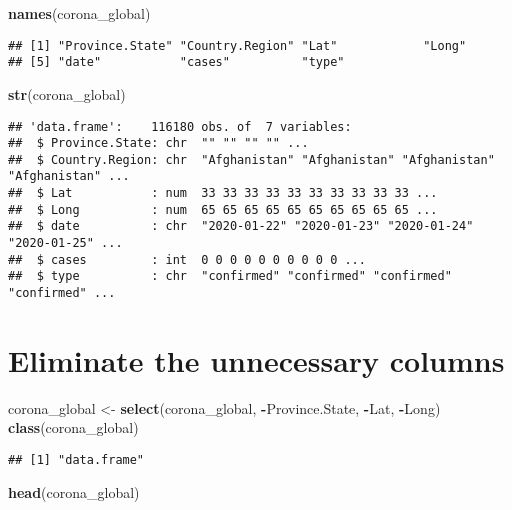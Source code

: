 \documentclass[
]{article}
\newenvironment{Shaded}{\begin{snugshade}}{\end{snugshade}}
\newcommand{\KeywordTok}[1]{\textcolor[rgb]{0.13,0.29,0.53}{\textbf{#1}}}
\newcommand{\NormalTok}[1]{#1}
\newcommand{\OperatorTok}[1]{\textcolor[rgb]{0.81,0.36,0.00}{\textbf{#1}}}
\newcommand{\StringTok}[1]{\textcolor[rgb]{0.31,0.60,0.02}{#1}}
\begin{document}
\begin{Shaded}
\begin{Highlighting}[]
\KeywordTok{names}\NormalTok{(corona_global)}
\end{Highlighting}
\end{Shaded}

\begin{verbatim}
## [1] "Province.State" "Country.Region" "Lat"            "Long"          
## [5] "date"           "cases"          "type"
\end{verbatim}

\begin{Shaded}
\begin{Highlighting}[]
\KeywordTok{str}\NormalTok{(corona_global)}
\end{Highlighting}
\end{Shaded}

\begin{verbatim}
## 'data.frame':    116180 obs. of  7 variables:
##  $ Province.State: chr  "" "" "" "" ...
##  $ Country.Region: chr  "Afghanistan" "Afghanistan" "Afghanistan" "Afghanistan" ...
##  $ Lat           : num  33 33 33 33 33 33 33 33 33 33 ...
##  $ Long          : num  65 65 65 65 65 65 65 65 65 65 ...
##  $ date          : chr  "2020-01-22" "2020-01-23" "2020-01-24" "2020-01-25" ...
##  $ cases         : int  0 0 0 0 0 0 0 0 0 0 ...
##  $ type          : chr  "confirmed" "confirmed" "confirmed" "confirmed" ...
\end{verbatim}

\hypertarget{eliminate-the-unnecessary-columns}{%
\section{Eliminate the unnecessary
columns}\label{eliminate-the-unnecessary-columns}}

\begin{Shaded}
\begin{Highlighting}[]
\NormalTok{corona_global <-}\StringTok{ }\KeywordTok{select}\NormalTok{(corona_global, }\OperatorTok{-}\NormalTok{Province.State, }\OperatorTok{-}\NormalTok{Lat, }\OperatorTok{-}\NormalTok{Long)}
\KeywordTok{class}\NormalTok{(corona_global)}
\end{Highlighting}
\end{Shaded}

\begin{verbatim}
## [1] "data.frame"
\end{verbatim}

\begin{Shaded}
\begin{Highlighting}[]
\KeywordTok{head}\NormalTok{(corona_global)}
\end{Highlighting}
\end{Shaded}
\end{document}
